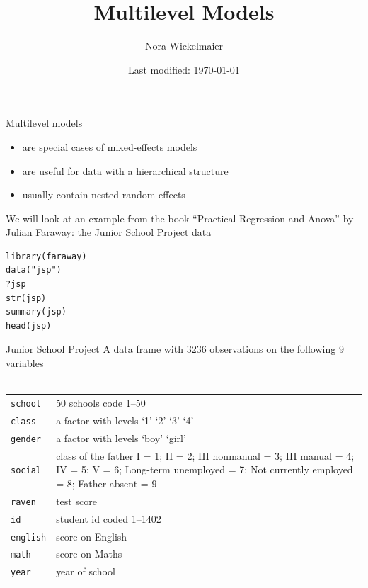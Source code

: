 \documentclass[aspectratio=169]{beamer}
\title{Multilevel Models}
\author{Nora Wickelmaier}
\date{Last modified: \today}
\begin{document}
\begin{frame}{}
\thispagestyle{empty}
\titlepage
\end{frame}


\begin{frame}[fragile]{Multilevel models}
  \begin{itemize}
    \item are special cases of mixed-effects models
    \item are useful for data with a hierarchical structure
    \item usually contain nested random effects
  \end{itemize}
  \vspace{.3cm}
  We will look at an example from the book ``Practical Regression and
  Anova'' by Julian Faraway: the Junior School Project data
\begin{lstlisting}
library(faraway)
data("jsp")
?jsp
str(jsp)
summary(jsp)
head(jsp)
\end{lstlisting}
  \nocite{Faraway2025}
\end{frame}

\begin{frame}{Junior School Project}
  A data frame with 3236 observations on the following 9 variables\\~\\

  \begin{tabular}{lp{11cm}}
    \hline
     \texttt{school} & 50 schools code 1--50 \\
     \texttt{class} & a factor with levels `1' `2' `3' `4' \\
     \texttt{gender} & a factor with levels `boy' `girl' \\
     \texttt{social} & class of the father I = 1; II = 2; III nonmanual = 3;
     III manual = 4; IV = 5; V = 6; Long-term unemployed = 7;
     Not currently employed = 8; Father absent = 9 \\
     \texttt{raven} & test score \\
     \texttt{id} & student id coded 1--1402 \\
     \texttt{english} & score on English \\
     \texttt{math} & score on Maths \\
     \texttt{year} & year of school \\
     \hline
  \end{tabular}

\end{frame}
\end{document}
